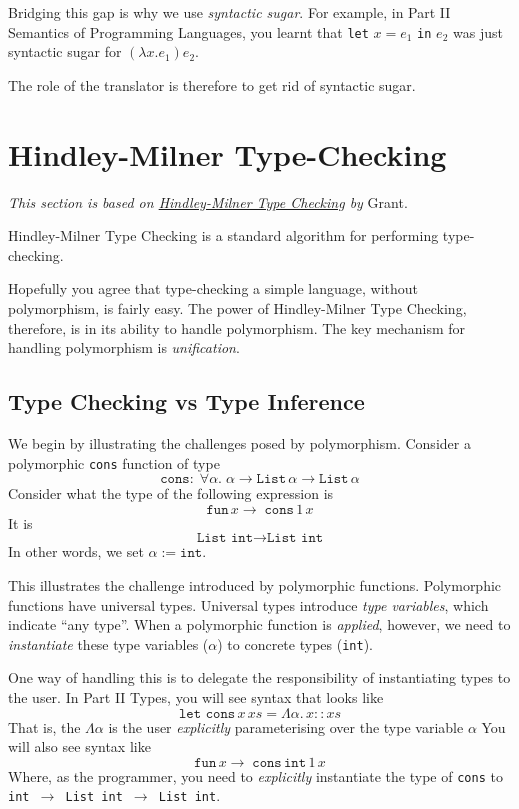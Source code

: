 {Bridging this gap is why we use \textit{syntactic sugar}. For example, in \textsf{Part II Semantics of Programming Languages}, you learnt that \texttt{let} $x = e_1$ \texttt{in} $e_2$ was just syntactic sugar for $(\lambda x. e_1) e_2$.

The role of the translator is therefore to get rid of syntactic sugar. 

\section{Hindley-Milner Type-Checking\optional}\label{section:hm-type-checking}
\textit{This section is based on \href{https://steshaw.org/hm/hindley-milner.pdf}{Hindley-Milner Type Checking} by} Grant.

Hindley-Milner Type Checking is a standard algorithm for performing type-checking. 

Hopefully you agree that type-checking a simple language, without polymorphism, is fairly easy. The power of Hindley-Milner Type Checking, therefore, is in its ability to handle polymorphism. The key mechanism for handling polymorphism is \textit{unification}.

\subsection{Type Checking vs Type Inference}
We begin by illustrating the challenges posed by polymorphism. Consider a polymorphic \texttt{cons} function of type
\[\texttt{cons}: \; \forall \alpha. \; \alpha \to \texttt{List} \, \alpha \to \texttt{List} \, \alpha\]
Consider what the type of the following expression is
\[\texttt{fun} \, x \rightarrow \; \texttt{cons} \, 1 \, x \]
It is
\[\texttt{List int} \rightarrow \texttt{List int}\]
In other words, we set $\alpha := \texttt{int}$.

This illustrates the challenge introduced by polymorphic functions. Polymorphic functions have universal types. Universal types introduce \textit{type variables}, which indicate ``any type''. When a polymorphic function is \textit{applied}, however, we need to \textit{instantiate} these type variables ($\alpha$) to concrete types (\texttt{int}). 

One way of handling this is to delegate the responsibility of instantiating types to the user. In \textsf{Part II Types}, you will see syntax that looks like
\[\texttt{let cons} \, x \, xs = \Lambda \alpha . \, x :: xs \]
That is, the $\Lambda \alpha$ is the user \textit{explicitly} parameterising over the type variable $\alpha$
You will also see syntax like
\[\texttt{fun} \, x \rightarrow \; \texttt{cons} \, \texttt{int} \, 1 \, x \]
Where, as the programmer, you need to \textit{explicitly} instantiate the type of \texttt{cons} to \texttt{int $\rightarrow$ List int $\rightarrow$ List int}. 

}
